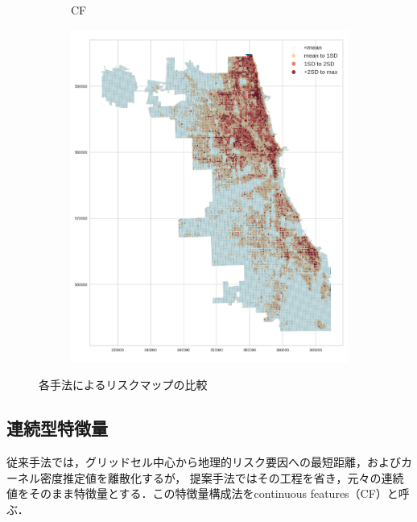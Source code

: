 \begin{figure}[t]
\begin{subfigure}{0.3\textwidth}
    \caption{CF}
    \label{fig:non-crime-timeseries-cf-risk}
  \end{subfigure}
  \begin{subfigure}{0.3\textwidth}
    \includegraphics[scale=0.25]{./figures/CI_riskmap.png}
    \caption{\cfsq}
    \label{fig:non-crime-timeseries-ci-risk}
  \end{subfigure}
  \caption{各手法によるリスクマップの比較}
  \label{fig:non-crime-timeseries-risks}
\end{figure}


\subsection{連続型特徴量}
従来手法\cite{caplan2015risk}では，グリッドセル中心から地理的リスク要因への最短距離，およびカーネル密度推定値を離散化するが，
提案手法ではその工程を省き，元々の連続値をそのまま特徴量とする．この特徴量構成法をcontinuous features（CF）と呼ぶ．

